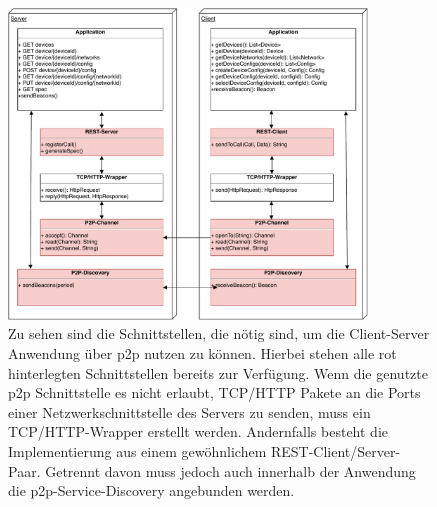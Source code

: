 \documentclass[12pt,a4paper]{article}
\newenvironment{leveldown}%
  {\let\section\subsection%
   \let\subsection\subsubsection%
   \let\subsubsection\paragraph%
   \let\paragraph\subparagraph%
  }{}
\begin{document}
    \begin{leveldown}
    
    
    \pagebreak
    
    
	\begin{figure}[ht]
		\centering
	    \includegraphics[width=0.85\textwidth]{../latex-ai-project/IOT-Connectivity-Protocol-Stack}
    	\caption{Zu sehen sind die Schnittstellen, die nötig sind, um die Client-Server Anwendung über p2p nutzen zu können. Hierbei stehen alle rot hinterlegten Schnittstellen bereits zur Verfügung. Wenn die genutzte p2p Schnittstelle es nicht erlaubt, TCP/HTTP Pakete an die Ports einer Netzwerkschnittstelle des Servers zu senden, muss ein TCP/HTTP-Wrapper erstellt werden. Andernfalls besteht die Implementierung aus einem gewöhnlichem REST-Client/Server-Paar. Getrennt davon muss jedoch auch innerhalb der Anwendung die p2p-Service-Discovery angebunden werden. }
	    \label{protocol_stack}
	\end{figure}     
    
    
    

\end{leveldown}
\end{document}
